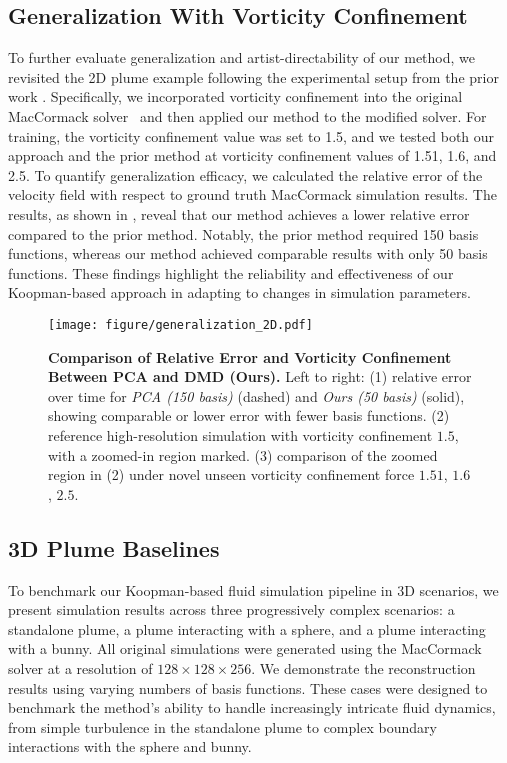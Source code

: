 \subsection{Generalization With Vorticity Confinement}
\label{sec:generalization}
To further evaluate generalization and artist-directability of our method, we revisited the 2D plume example following the experimental setup from the prior work \cite{kim2013subspace}. Specifically, we incorporated vorticity confinement \cite{fedkiw2001visual} into the original MacCormack solver~\cite{selle2008unconditionally} and then applied our method to the modified solver. For training, the vorticity confinement value was set to 1.5, and we tested both our approach and the prior method at vorticity confinement values of 1.51, 1.6, and 2.5. To quantify generalization efficacy, we calculated the relative error of the velocity field with respect to ground truth MacCormack\cite{selle2008unconditionally} simulation results. The results, as shown in , reveal that our method achieves a lower relative error compared to the prior method. Notably, the prior method required 150 basis functions, whereas our method achieved comparable results with only 50 basis functions. These findings highlight the reliability and effectiveness of our Koopman-based approach in adapting to changes in simulation parameters.

\begin{figure}[!ht]
    \centering
    \texttt{[image: figure/generalization\_2D.pdf]}
    \caption{\textbf{Comparison of Relative Error and Vorticity Confinement Between PCA  and DMD (Ours).} Left to right: (1) relative error over time for \textit{PCA (150 basis)} (dashed) and \textit{Ours (50 basis)} (solid), showing comparable or lower error with fewer basis functions. (2) reference high-resolution simulation with vorticity confinement $1.5$, with a zoomed-in region marked. (3) comparison of the zoomed region in (2) under novel unseen vorticity confinement force $1.51$, $1.6$, $2.5$.}
    \label{fig:generalization}
    \Description{}
\end{figure}


\subsection{3D Plume Baselines}
To benchmark our Koopman-based fluid simulation pipeline in 3D scenarios, we present simulation results across three progressively complex scenarios: a standalone plume, a plume interacting with a sphere, and a plume interacting with a bunny. All original simulations were generated using the MacCormack solver \cite{selle2008unconditionally} at a resolution of $128 \times 128 \times 256$. We demonstrate the reconstruction results using varying numbers of basis functions. These cases were designed to benchmark the method’s ability to handle increasingly intricate fluid dynamics, from simple turbulence in the standalone plume to complex boundary interactions with the sphere and bunny.

